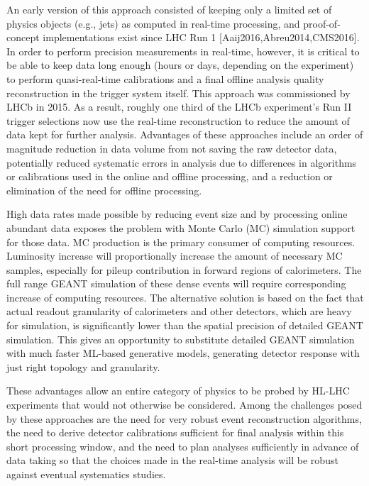 An early version of this approach consisted of keeping only a limited set of physics objects (e.g., jets) as computed in real-time processing, and proof-of-concept implementations exist since LHC Run 1 [Aaij2016,Abreu2014,CMS2016]. In order to perform precision measurements in real-time, however, it is critical to be able to keep data long enough (hours or days, depending on the experiment) to perform quasi-real-time calibrations and a final offline analysis quality reconstruction in the trigger system itself. This approach was commissioned by LHCb in 2015. As a result, roughly one third of the LHCb experiment’s Run II trigger selections now use the real-time reconstruction to reduce the amount of data kept for further analysis. Advantages of these approaches include an order of magnitude reduction in data volume from not saving the raw detector data, potentially reduced systematic errors in analysis due to differences in algorithms or calibrations used in the online and offline processing, and a reduction or elimination of the need for offline processing. 

High data rates made possible by reducing event size and by processing online abundant data exposes the problem with Monte Carlo (MC) simulation support for those data. MC production is the primary consumer of computing resources. Luminosity increase will proportionally increase the amount of necessary MC samples, especially for pileup contribution in forward regions of calorimeters. The full range GEANT simulation of these dense events will require corresponding increase of computing resources. The alternative solution is based on the fact that actual readout granularity of calorimeters and other detectors, which are heavy for simulation, is significantly lower than the spatial precision of detailed GEANT simulation. This gives an opportunity to substitute detailed GEANT simulation with much faster ML-based generative models, generating detector response with just right topology and granularity.

These advantages allow an entire category of physics to be probed by HL-LHC experiments that would not otherwise be considered. Among the challenges posed by these approaches are the need for very robust event reconstruction algorithms, the need to derive detector calibrations sufficient for final analysis within this short processing window, and the need to plan analyses sufficiently in advance of data taking so that the choices made in the real-time analysis will be robust against eventual systematics studies.

